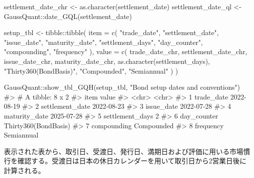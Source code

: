 \documentclass[
  letterpaper,
  DIV=11,
  numbers=noendperiod]{scrreprt}
\newenvironment{Shaded}{\begin{snugshade}}{\end{snugshade}}
\newcommand{\AttributeTok}[1]{\textcolor[rgb]{0.40,0.45,0.13}{#1}}
\newcommand{\CommentTok}[1]{\textcolor[rgb]{0.37,0.37,0.37}{#1}}
\newcommand{\FunctionTok}[1]{\textcolor[rgb]{0.28,0.35,0.67}{#1}}
\newcommand{\NormalTok}[1]{\textcolor[rgb]{0.00,0.23,0.31}{#1}}
\newcommand{\OtherTok}[1]{\textcolor[rgb]{0.00,0.23,0.31}{#1}}
\newcommand{\SpecialCharTok}[1]{\textcolor[rgb]{0.37,0.37,0.37}{#1}}
\newcommand{\StringTok}[1]{\textcolor[rgb]{0.13,0.47,0.30}{#1}}
\begin{document}
\begin{Shaded}
\begin{Highlighting}[]
\NormalTok{settlement\_date\_chr }\OtherTok{\textless{}{-}} \FunctionTok{as.character}\NormalTok{(settlement\_date)}
\NormalTok{settlement\_date\_ql }\OtherTok{\textless{}{-}}\NormalTok{ GaussQuant}\SpecialCharTok{::}\FunctionTok{date\_GQL}\NormalTok{(settlement\_date)}

\NormalTok{setup\_tbl }\OtherTok{\textless{}{-}}\NormalTok{ tibble}\SpecialCharTok{::}\FunctionTok{tibble}\NormalTok{(}
  \AttributeTok{item =} \FunctionTok{c}\NormalTok{(}
    \StringTok{"trade\_date"}\NormalTok{,}
    \StringTok{"settlement\_date"}\NormalTok{,}
    \StringTok{"issue\_date"}\NormalTok{,}
    \StringTok{"maturity\_date"}\NormalTok{,}
    \StringTok{"settlement\_days"}\NormalTok{,}
    \StringTok{"day\_counter"}\NormalTok{,}
    \StringTok{"compounding"}\NormalTok{,}
    \StringTok{"frequency"}
\NormalTok{  ),}
  \AttributeTok{value =} \FunctionTok{c}\NormalTok{(}
\NormalTok{    trade\_date\_chr,}
\NormalTok{    settlement\_date\_chr,}
\NormalTok{    issue\_date\_chr,}
\NormalTok{    maturity\_date\_chr,}
    \FunctionTok{as.character}\NormalTok{(settlement\_days),}
    \StringTok{"Thirty360(BondBasis)"}\NormalTok{,}
    \StringTok{"Compounded"}\NormalTok{,}
    \StringTok{"Semiannual"}
\NormalTok{  )}
\NormalTok{)}

\NormalTok{GaussQuant}\SpecialCharTok{::}\FunctionTok{show\_tbl\_GQH}\NormalTok{(setup\_tbl, }\StringTok{"Bond setup dates and conventions"}\NormalTok{)}
\CommentTok{\#\textgreater{} \# A tibble: 8 x 2}
\CommentTok{\#\textgreater{}   item            value               }
\CommentTok{\#\textgreater{}   \textless{}chr\textgreater{}           \textless{}chr\textgreater{}               }
\CommentTok{\#\textgreater{} 1 trade\_date      2022{-}08{-}19          }
\CommentTok{\#\textgreater{} 2 settlement\_date 2022{-}08{-}23          }
\CommentTok{\#\textgreater{} 3 issue\_date      2022{-}07{-}28          }
\CommentTok{\#\textgreater{} 4 maturity\_date   2025{-}07{-}28          }
\CommentTok{\#\textgreater{} 5 settlement\_days 2                   }
\CommentTok{\#\textgreater{} 6 day\_counter     Thirty360(BondBasis)}
\CommentTok{\#\textgreater{} 7 compounding     Compounded          }
\CommentTok{\#\textgreater{} 8 frequency       Semiannual}
\end{Highlighting}
\end{Shaded}

表示された表から、取引日、受渡日、発行日、満期日および評価に用いる市場慣行を確認する。受渡日は日本の休日カレンダーを用いて取引日から2営業日後に計算される。
\end{document}
